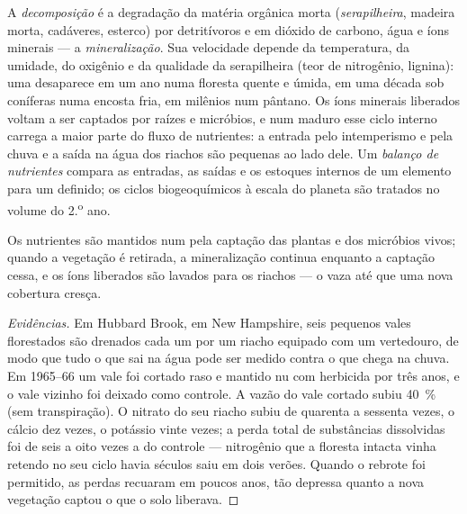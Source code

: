 \begin{definition}\label{def:b1:ecosystem-dynamics:decomposition}
A \emph{decomposição} é a degradação da matéria orgânica morta
(\emph{serapilheira}, madeira morta, cadáveres, esterco) por
detritívoros e  em dióxido de carbono, água e íons
minerais --- a \emph{mineralização}. Sua velocidade depende da
temperatura, da umidade, do oxigênio e da qualidade da serapilheira
(teor de nitrogênio, lignina): uma  desaparece em um ano numa
floresta quente e úmida, em uma década sob coníferas numa encosta
fria, em milênios num pântano. Os íons minerais liberados voltam a ser
captados por raízes e micróbios, e num  maduro esse ciclo
interno carrega a maior parte do fluxo de nutrientes: a entrada pelo
intemperismo e pela chuva e a saída na água dos riachos são pequenas
ao lado dele. Um \emph{balanço de nutrientes} compara as entradas, as
saídas e os estoques internos de um elemento para um 
definido; os ciclos biogeoquímicos à escala do planeta são tratados no
volume do 2.\textsuperscript{o} ano.
\end{definition}

\begin{proposition}\label{prop:b1:ecosystem-dynamics:retention}
Os nutrientes são mantidos num  pela captação das plantas e
dos micróbios vivos; quando a vegetação é retirada, a mineralização
continua enquanto a captação cessa, e os íons liberados são lavados
para os riachos --- o  vaza até que uma nova cobertura
cresça.
\end{proposition}
\begin{proof}[Evidências]
Em Hubbard Brook, em New Hampshire, seis pequenos vales florestados
são drenados cada um por um riacho equipado com um vertedouro, de modo
que tudo o que sai na água pode ser medido contra o que chega na
chuva. Em 1965--66 um vale foi cortado raso e mantido nu com
herbicida por três anos, e o vale vizinho foi deixado como controle. A
vazão do vale cortado subiu \qty{40}{\%} (sem transpiração). O nitrato
do seu riacho subiu de quarenta a sessenta vezes, o cálcio dez vezes,
o potássio vinte vezes; a perda total de substâncias dissolvidas foi
de seis a oito vezes a do controle --- nitrogênio que a floresta
intacta vinha retendo no seu ciclo havia séculos saiu em dois verões.
Quando o rebrote foi permitido, as perdas recuaram em poucos anos, tão
depressa quanto a nova vegetação captou o que o solo liberava.
\end{proof}

